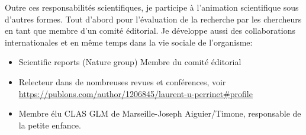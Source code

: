 Outre ces responsabilités scientifiques, je participe à l'animation scientifique sous d'autres formes. Tout d'abord pour l'évaluation de la recherche par les chercheurs en tant que membre d'un comité éditorial. Je développe aussi des collaborations internationales et en même temps dans la vie sociale de l'organisme:


\begin{itemize}

%

	\item Scientific reports (Nature group) Membre du comité éditorial

	\item  Relecteur dans de nombreuses revues et conférences, voir \url{https://publons.com/author/1206845/laurent-u-perrinet#profile}

	\item Membre élu CLAS GLM de Marseille-Joseph Aiguier/Timone, responsable de la petite enfance.

\end{itemize}



\newpage
